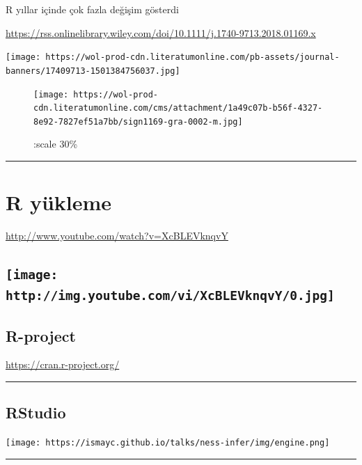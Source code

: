 \documentclass[]{article}
\begin{document}
R yıllar içinde çok fazla değişim gösterdi

\url{https://rss.onlinelibrary.wiley.com/doi/10.1111/j.1740-9713.2018.01169.x}

\texttt{[image: https://wol-prod-cdn.literatumonline.com/pb-assets/journal-banners/17409713-1501384756037.jpg]}

\begin{figure}
\centering
\texttt{[image: https://wol-prod-cdn.literatumonline.com/cms/attachment/1a49c07b-b56f-4327-8e92-7827ef51a7bb/sign1169-gra-0002-m.jpg]}
\caption{:scale 30\%}
\end{figure}

\begin{center}\rule{0.5\linewidth}{\linethickness}\end{center}

\hypertarget{r-yukleme}{%
\section{R yükleme}\label{r-yukleme}}

\url{http://www.youtube.com/watch?v=XcBLEVknqvY}

\hypertarget{what-is-r}{%
\subsection{\texorpdfstring{\protect\texttt{[image: http://img.youtube.com/vi/XcBLEVknqvY/0.jpg]}}{What is R?}}\label{what-is-r}}

\hypertarget{r-project}{%
\subsection{R-project}\label{r-project}}

\url{https://cran.r-project.org/}

\begin{center}\rule{0.5\linewidth}{\linethickness}\end{center}

\hypertarget{rstudio}{%
\subsection{RStudio}\label{rstudio}}

\texttt{[image: https://ismayc.github.io/talks/ness-infer/img/engine.png]}

\begin{center}\rule{0.5\linewidth}{\linethickness}\end{center}
\end{document}
